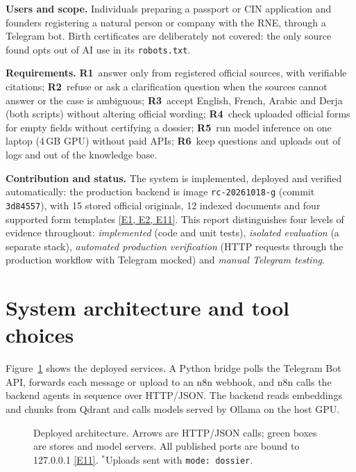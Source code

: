 \documentclass[10pt,a4paper]{article}
\newcommand{\code}[1]{\texttt{\small #1}}
\newcommand{\ev}[1]{\hyperref[app:evidence]{[#1]}}
\begin{document}
\textbf{Users and scope.} Individuals preparing a passport or CIN application and founders registering a
natural person or company with the RNE, through a Telegram bot. Birth certificates are deliberately not
covered: the only source found opts out of AI use in its \code{robots.txt}.

\textbf{Requirements.} \textbf{R1}~answer only from registered official sources, with verifiable citations;
\textbf{R2}~refuse or ask a clarification question when the sources cannot answer or the case is ambiguous;
\textbf{R3}~accept English, French, Arabic and Derja (both scripts) without altering official wording;
\textbf{R4}~check uploaded official forms for empty fields without certifying a dossier; \textbf{R5}~run model
inference on one laptop (4\,GB GPU) without paid APIs; \textbf{R6}~keep questions and uploads out of logs and
out of the knowledge base.

\textbf{Contribution and status.} The system is implemented, deployed and verified automatically: the
production backend is image \code{rc-20261018-g} (commit \code{3d84557}), with 15 stored official originals,
12 indexed documents and four supported form templates \ev{E1, E2, E11}. This report distinguishes four levels of
evidence throughout: \emph{implemented} (code and unit tests), \emph{isolated evaluation} (a separate stack),
\emph{automated production verification} (HTTP requests through the production workflow with Telegram mocked)
and \emph{manual Telegram testing}.

\section{System architecture and tool choices}\label{sec:arch}
Figure~\ref{fig:arch} shows the deployed services. A Python bridge polls the Telegram Bot API, forwards each
message or upload to an n8n webhook, and n8n calls the backend agents in sequence over HTTP/JSON. The backend
reads embeddings and chunks from Qdrant and calls models served by Ollama on the host GPU.

\begin{figure}[H]
  \centering
  \resizebox{\textwidth}{!}{}
  \caption{Deployed architecture. Arrows are HTTP/JSON calls; green boxes are stores and model servers. All
  published ports are bound to 127.0.0.1 \ev{E11}. $^\ast$Uploads sent with \code{mode: dossier}.}
  \label{fig:arch}
\end{figure}
\end{document}
